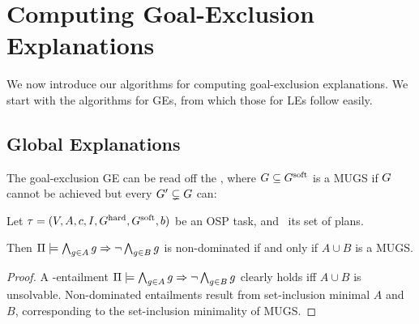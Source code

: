\section{Computing Goal-Exclusion Explanations}
\label{algorithms}


We now introduce our algorithms for computing goal-exclusion
explanations. We start with the algorithms for GEs, from which those
for LEs follow easily.




\subsection{Global Explanations}
\label{algorithms:ge}

The goal-exclusion GE can be read off the , where $G \subseteq G^{\text{\textup{soft}}}$ is a MUGS
if $G$ cannot be achieved but every $G' \subsetneq G$
can:

\begin{proposition}
\label{pro:ge-from-mugs}
Let $\tau =
(V,\allowbreak A,\allowbreak{\ensuremath{c}},\allowbreak I,\allowbreak G^{\text{\textup{hard}}},\allowbreak G^{\text{\textup{soft}}},\allowbreak{\ensuremath{b}})$
be an OSP task, and \plans\ its set of plans.

Then $\Pi \models \bigwedge_{g \in A} g \Rightarrow \neg \bigwedge_{g \in B}
  g$ is non-dominated if and only if $A \cup B$ is a MUGS.
\end{proposition}

\begin{proof}
A \plans-entailment $\Pi \models \bigwedge_{g \in A} g \Rightarrow \neg
  \bigwedge_{g \in B} g$ clearly holds iff $A \cup B$ is
unsolvable. Non-dominated entailments result from set-inclusion
minimal $A$ and $B$, corresponding to the set-inclusion minimality of
MUGS.
\end{proof}

